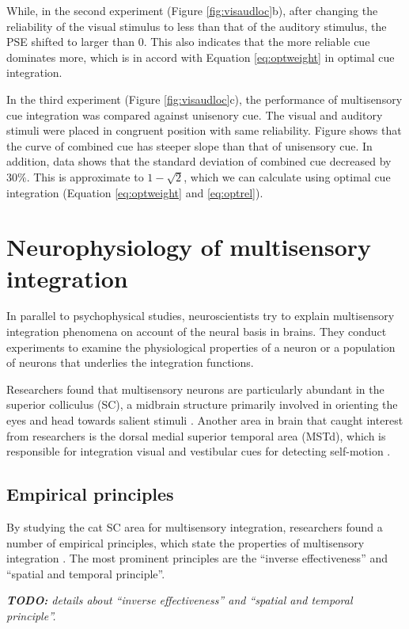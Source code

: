 \documentclass{article}[11pt]
\newcommand{\TODO}[1]{\emph{\small{{\bf TODO: } #1}}}
\begin{document}
While, in the second experiment (Figure \ref{fig:visaudloc}b), after changing the reliability of the visual stimulus to less than that of the auditory stimulus, the PSE shifted to larger than 0. This also indicates that the more reliable cue dominates more, which is in accord with Equation \ref{eq:optweight} in optimal cue integration.

In the third experiment (Figure \ref{fig:visaudloc}c), the performance of multisensory cue integration was compared against unisenory cue. The visual and auditory stimuli were placed in congruent position with same reliability. Figure shows that the curve of combined cue has steeper slope than that of unisensory cue. In addition, data shows that the standard deviation of combined cue decreased by $30\%$. This is approximate to $1-\sqrt{2}$, which we can calculate using optimal cue integration (Equation \ref{eq:optweight} and \ref{eq:optrel}).

\section{Neurophysiology of multisensory integration}
In parallel to psychophysical studies, neuroscientists try to explain multisensory integration phenomena on account of the neural basis in brains.
They conduct experiments to examine the physiological properties of a neuron or a population of neurons that underlies the integration functions.

Researchers found that multisensory neurons are particularly abundant in the superior colliculus (SC), a midbrain structure primarily involved in orienting the eyes and head towards salient stimuli \cite{sparks_translation_1986}. Another area in brain that caught interest from researchers is the dorsal medial superior temporal area (MSTd), which is responsible for integration visual and vestibular cues for detecting self-motion \cite{gu_visual_2006}.

\subsection{Empirical principles}
By studying the cat SC area for multisensory integration, researchers found a number of empirical principles, which state the properties of multisensory integration \cite{meredith_interactions_1983}. The most prominent principles are the ``inverse effectiveness'' and ``spatial and temporal principle''.

\TODO{details about ``inverse effectiveness'' and ``spatial and temporal principle''.}
\end{document}
